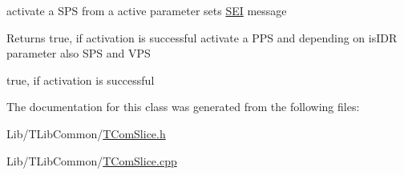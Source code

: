 activate a S\+PS from a active parameter sets \hyperlink{class_s_e_i}{S\+EI} message \begin{DoxyReturn}{Returns}
true, if activation is successful activate a P\+PS and depending on is\+I\+DR parameter also S\+PS and V\+PS 

true, if activation is successful 
\end{DoxyReturn}


The documentation for this class was generated from the following files\+:\begin{DoxyCompactItemize}
\item 
Lib/\+T\+Lib\+Common/\hyperlink{_t_com_slice_8h}{T\+Com\+Slice.\+h}\item 
Lib/\+T\+Lib\+Common/\hyperlink{_t_com_slice_8cpp}{T\+Com\+Slice.\+cpp}\end{DoxyCompactItemize}
